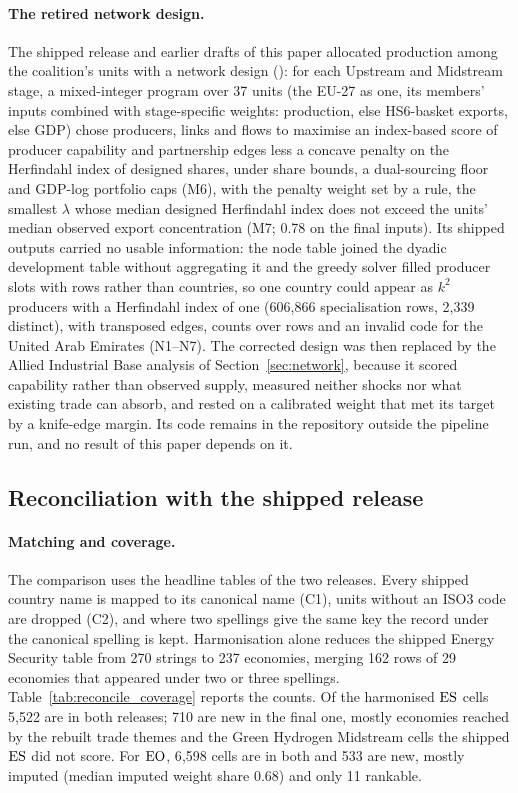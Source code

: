 \paragraph{The retired network design.} The shipped release and earlier drafts of this paper
allocated production among the coalition's units with a network design
(): for each Upstream and Midstream stage, a
mixed-integer program over 37 units (the EU-27 as one, its members' inputs combined with
stage-specific weights: production, else HS6-basket exports, else GDP) chose producers, links and flows to maximise an
index-based score of producer capability and partnership edges less a concave penalty on the
Herfindahl index of designed shares, under share bounds, a dual-sourcing floor and GDP-log portfolio
caps (M6), with the penalty weight set by a rule, the smallest $\lambda$ whose median designed
Herfindahl index does not exceed the units' median observed export concentration (M7; 0.78 on the
final inputs). Its shipped outputs carried no usable information: the node table joined the dyadic
development table without aggregating it and the greedy solver filled producer slots with rows rather
than countries, so one country could appear as $k^2$ producers with a Herfindahl index of one
(606{,}866 specialisation rows, 2{,}339 distinct), with transposed edges, counts over rows and an
invalid code for the United Arab Emirates (N1--N7). The corrected design was then replaced by the
Allied Industrial Base analysis of Section~\ref{sec:network}, because it scored capability rather
than observed supply, measured neither shocks nor what existing trade can absorb, and rested on a
calibrated weight that met its target by a knife-edge margin. Its code remains in the repository
outside the pipeline run, and no result of this paper depends on it.

\subsection{Reconciliation with the shipped release}
\label{subsec:corr_reconciliation}

\paragraph{Matching and coverage.} The comparison uses the headline tables of the two releases.
Every shipped country name is mapped to its canonical name (C1), units without an ISO3 code are
dropped (C2), and where two spellings give the same key the record under the canonical spelling is
kept. Harmonisation alone reduces the shipped Energy Security table from 270 strings to 237
economies, merging 162 rows of 29 economies that appeared under two or three spellings.
Table~\ref{tab:reconcile_coverage} reports the counts. Of the harmonised $\mathrm{ES}$ cells 5{,}522 are in
both releases; 710 are new in the final one, mostly economies reached by the rebuilt trade themes
and the Green Hydrogen Midstream cells the shipped $\mathrm{ES}$ did not score. For $\mathrm{EO}$, 6{,}598 cells are
in both and 533 are new, mostly imputed (median imputed weight share 0.68) and only 11 rankable.

